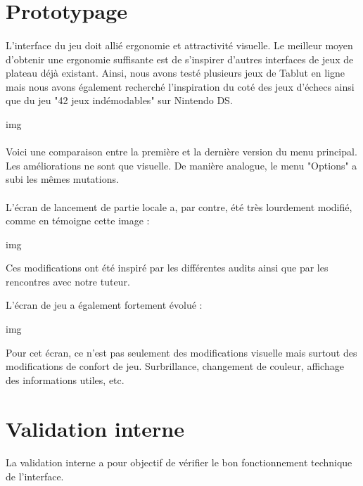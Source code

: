 \documentclass[11pt]{article} %
\begin{document}
\section{Prototypage}
\paragraph{}
L'interface du jeu doit allié ergonomie et attractivité visuelle. Le meilleur moyen d'obtenir une ergonomie suffisante est de s'inspirer d'autres interfaces de jeux de plateau déjà existant. Ainsi, nous avons testé plusieurs jeux de Tablut en ligne mais nous avons également recherché l'inspiration du coté des jeux d’échecs ainsi que du jeu "42 jeux indémodables" sur Nintendo DS.

img

\paragraph{}
Voici une comparaison entre la première et la dernière version du menu principal. Les améliorations ne sont que visuelle. De manière analogue, le menu "Options" a subi les mêmes mutations. 

\paragraph{}
L'écran de lancement de partie locale a, par contre, été très lourdement modifié, comme en témoigne cette image :

img

Ces modifications ont été inspiré par les différentes audits ainsi que par les rencontres avec notre tuteur.

L'écran de jeu a également fortement évolué :

img

Pour cet écran, ce n'est pas seulement des modifications visuelle mais surtout des modifications de confort de jeu. Surbrillance, changement de couleur, affichage des informations utiles, etc.

\section{Validation interne}
\paragraph{}
La validation interne a pour objectif de vérifier le bon fonctionnement technique de l'interface.
\end{document}
